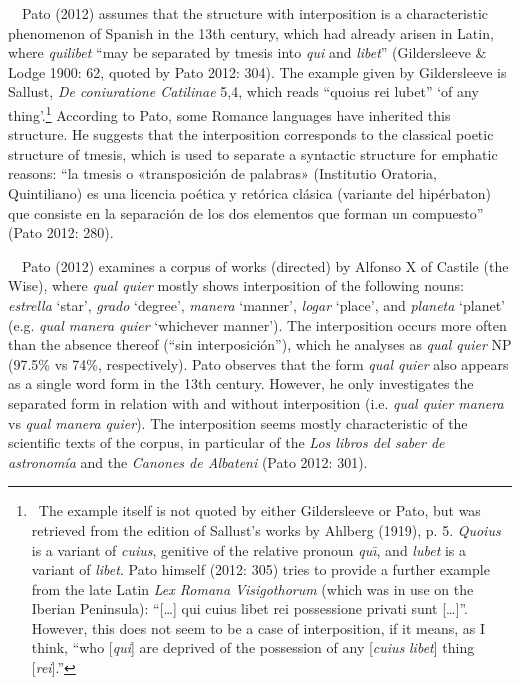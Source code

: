 \documentclass[10pt]{article}
\newenvironment{styleStandard}{\renewcommand\baselinestretch{1.25}\setlength\leftskip{0cm}\setlength\rightskip{0cm}\setlength\parindent{0cm}\setlength\parfillskip{0pt plus 1fil}\setlength\parskip{0in plus 1pt}\writerlistparindent\writerlistleftskip\leavevmode\normalfont\normalsize\fontsize{12pt}{14.4pt}\selectfont\writerlistlabel\ignorespaces}{\unskip\vspace{0in plus 1pt}\par}
\newcommand\writerlistleftskip{}
\newcommand\writerlistparindent{}
\newcommand\writerlistlabel{}
\begin{document}
\begin{styleStandard}
\ \ Pato (2012) assumes that the structure with interposition is a characteristic phenomenon of Spanish in the 13th century, which had already arisen in Latin, where \textit{quilibet} “may be separated by tmesis into \textit{qui} and \textit{libet}” (Gildersleeve \& Lodge 1900: 62, quoted by Pato 2012: 304). The example given by Gildersleeve is Sallust, \textit{De coniuratione Catilinae} 5,4, which reads “quoius rei lubet” ‘of any thing’.\footnote{\ The example itself is not quoted by either Gildersleeve or Pato, but was retrieved from the edition of Sallust’s works by Ahlberg (1919), p. 5. \textit{Quoius} is a variant of \textit{cuius}, genitive of the relative pronoun \textit{qu\=\i}, and \textit{lubet} is a variant of \textit{libet}. \textrm{Pato himself (2012: 305) tries to provide a further example from the late Latin}\textrm{\textbf{ }}\textit{Lex Romana Visigothorum} (which was in use on the Iberian Peninsula): “[…] qui cuius libet rei possessione privati sunt […]”. However, this does not seem to be a case of interposition, if it means, as I think, “who [\textit{qui}] are deprived of the possession of any [\textit{cuius} \textit{libet}] thing [\textit{rei}].”} According to Pato, some Romance languages have inherited this structure. He suggests that the interposition corresponds to the classical poetic structure of tmesis, which is used to separate a syntactic structure for emphatic reasons: “la tmesis o «transposición de palabras» (Institutio Oratoria, Quintiliano) es una licencia poética y retórica clásica (variante del hipérbaton) que consiste en la separación de los dos elementos que forman un compuesto” (Pato 2012: 280). 
\end{styleStandard}

\begin{styleStandard}
\ \ Pato (2012) examines a corpus of works (directed) by Alfonso X of Castile (the Wise), where \textit{qual quier} mostly shows interposition of the following nouns: \textit{estrella} ‘star’, \textit{grado} ‘degree’, \textit{manera} ‘manner’, \textit{logar} ‘place’, and \textit{planeta} ‘planet’ (e.g. \textit{qual manera quier} ‘whichever manner’). The interposition occurs more often than the absence thereof (“sin interposición”), which he analyses as \textit{qual quier} NP (97.5\% vs 74\%, respectively). Pato observes that the form \textit{qual quier} also appears as a single word form in the 13th century. However, he only investigates the separated form in relation with and without interposition (i.e. \textit{qual quier manera} vs \textit{qual manera quier}). The interposition seems mostly characteristic of the scientific texts of the corpus, in particular of the \textit{Los libros del saber de astronomía} and the \textit{Canones de Albateni} (Pato 2012: 301). 
\end{styleStandard}
\end{document}
